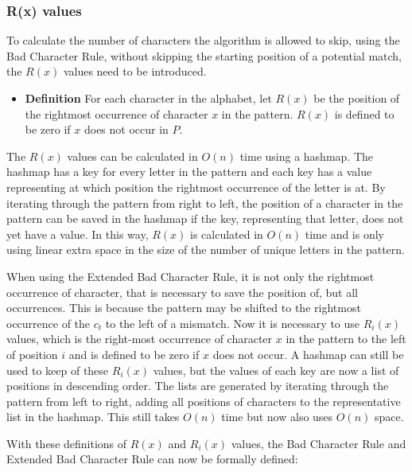 \subsubsection{R(x) values}
To calculate the number of characters the algorithm is allowed to skip, using the Bad Character Rule, without skipping the starting position of a potential match, the $R(x)$ values need to be introduced. 

\begin{itemize}
    \item[] \textbf{Definition} For each character in the alphabet, let $R(x)$ be the position of the rightmost occurrence of character $x$ in the pattern. $R(x)$ is defined to be zero if $x$ does not occur in $P$.
\end{itemize}

The $R(x)$ values can be calculated in $O(n)$ time using a hashmap. The hashmap has a key for every letter in the pattern and each key has a value representing at which position the rightmost occurrence of the letter is at. By iterating through the pattern from right to left, the position of a character in the pattern can be saved in the hashmap if the key, representing that letter, does not yet have a value. In this way, $R(x)$ is calculated in $O(n)$ time and is only using linear extra space in the size of the number of unique letters in the pattern.


When using the Extended Bad Character Rule, it is not only the rightmost occurrence of character, that is necessary to save the position of, but all occurrences. This is because the pattern may be shifted to the rightmost occurrence of the $c_t$ to the left of a mismatch. Now it is necessary to use $R_i(x)$ values, which is the right-most occurrence of character $x$ in the pattern to the left of position $i$ and is defined to be zero if $x$ does not occur. A hashmap can still be used to keep of these $R_i(x)$ values, but the values of each key are now a list of positions in descending order. The lists are generated by iterating through the pattern from left to right, adding all positions of characters to the representative list in the hashmap. This still takes $O(n)$ time but now also uses $O(n)$ space.


With these definitions of $R(x)$ and $R_i(x)$ values, the Bad Character Rule and Extended Bad Character Rule can now be formally defined:

